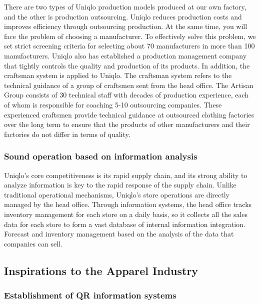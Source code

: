 \documentclass[12pt,a4paper]{article}
\begin{document}
There are two types of Uniqlo production models produced at our own
factory, and the other is production outsourcing. Uniqlo reduces
production costs and improves efficiency through outsourcing production.
At the same time, you will face the problem of choosing a manufacturer.
To effectively solve this problem, we set strict screening criteria for
selecting about 70 manufacturers in more than 100 manufacturers. Uniqlo
also has established a production management company that tightly
controls the quality and production of its products. In addition, the
craftsman system is applied to Uniqlo. The craftsman system refers to
the technical guidance of a group of craftsmen sent from the head
office. The Artisan Group consists of 30 technical staff with decades of
production experience, each of whom is responsible for coaching 5-10
outsourcing companies. These experienced craftsmen provide technical
guidance at outsourced clothing factories over the long term to ensure
that the products of other manufacturers and their factories do not
differ in terms of quality.

\hypertarget{sound-operation-based-on-information-analysis}{%
\subsubsection{Sound operation based on information
analysis}\label{sound-operation-based-on-information-analysis}}

Uniqlo's core competitiveness is its rapid supply chain, and its strong
ability to analyze information is key to the rapid response of the
supply chain. Unlike traditional operational mechanisms, Uniqlo's store
operations are directly managed by the head office. Through information
systems, the head office tracks inventory management for each store on a
daily basis, so it collects all the sales data for each store to form a
vast database of internal information integration. Forecast and
inventory management based on the analysis of the data that companies
can sell.

\hypertarget{inspirations-to-the-apparel-industry}{%
\subsection{Inspirations to the Apparel
Industry}\label{inspirations-to-the-apparel-industry}}

\hypertarget{establishment-of-qr-information-systems}{%
\subsubsection{Establishment of QR information
systems}\label{establishment-of-qr-information-systems}}
\end{document}
